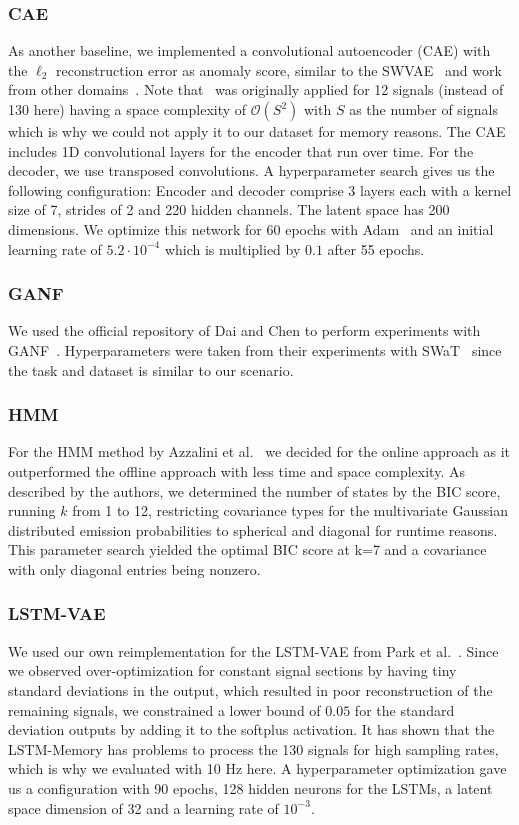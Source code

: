 \documentclass[journal]{IEEEtran}
\begin{document}
\subsubsection{CAE}
As another baseline, we implemented a convolutional autoencoder (CAE) with the $\ell_2$ reconstruction error as anomaly score, similar to the SWVAE~\cite{swvae} and work from other domains~\cite{chen2018autoencoder, ae_ssim, itae, memae}.
Note that~\cite{swvae} was originally applied for 12 signals (instead of 130 here) having a space complexity of $\mathcal{O}(S^2)$ with $S$ as the number of signals which is why we could not apply it to our dataset for memory reasons.
The CAE includes 1D convolutional layers for the encoder that run over time.
For the decoder, we use transposed convolutions.
A hyperparameter search gives us the following configuration:
Encoder and decoder comprise 3 layers each with a kernel size of 7, strides of 2 and 220 hidden channels.
The latent space has 200 dimensions.
We optimize this network for 60 epochs with Adam~\cite{adam} and an initial learning rate of $5.2 \cdot 10^{-4}$ which is multiplied by $0.1$ after 55 epochs.
{
\subsubsection{GANF}
We used the official repository of Dai and Chen to perform experiments with GANF~\cite{GANF}.
Hyperparameters were taken from their experiments with SWaT~\cite{swat} since the task and dataset is similar to our scenario.
\subsubsection{HMM}
For the HMM method by Azzalini et al.~\cite{hmm_ad} we decided for the online approach as it outperformed the offline approach with less time and space complexity.
As described by the authors, we determined the number of states by the BIC score, running $k$ from 1 to 12, restricting covariance types for the multivariate Gaussian distributed emission probabilities to spherical and diagonal for runtime reasons.
This parameter search yielded the optimal BIC score at k=7 and a covariance with only diagonal entries being nonzero.
\subsubsection{LSTM-VAE}
We used our own reimplementation for the LSTM-VAE from Park et al.~\cite{park2018multimodal}.
Since we observed over-optimization for constant signal sections by having tiny standard deviations in the output, which resulted in poor reconstruction of the remaining signals, we constrained a lower bound of $0.05$ for the standard deviation outputs by adding it to the softplus activation.
It has shown that the LSTM-Memory has problems to process the 130 signals for high sampling rates, which is why we evaluated with 10 Hz here.
A hyperparameter optimization gave us a configuration with 90 epochs, 128 hidden neurons for the LSTMs, a latent space dimension of 32 and a learning rate of $10^{-3}$.}
\end{document}
